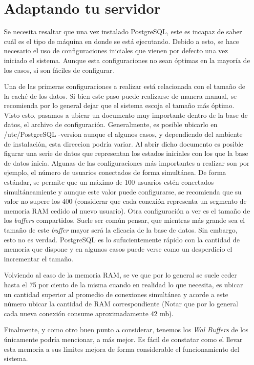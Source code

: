 \documentclass[12pt,conference]{IEEEtran}
\begin{document}
\section{Adaptando tu servidor}

Se necesita resaltar  que una vez instalado PostgreSQL, este es incapaz de saber cuál es el tipo de máquina en donde se está ejecutando. Debido a esto, se hace necesario el uso de configuraciones iniciales que vienen por defecto una vez iniciado el sistema. Aunque esta configuraciones no sean óptimas en la mayoría de los casos, si son fáciles de configurar.

Una de las primeras configuraciones a realizar está relacionada con el tamaño de la caché de los datos. Si bien este paso puede realizarse de manera manual, se recomienda por lo general dejar que el sistema escoja el tamaño más óptimo. Visto esto, pasamos a ubicar un documento muy importante dentro de la base de datos, el archivo de configuración. Generalmente, es posible ubicarlo en /utc/PostgreSQL -version aunque el algunos casos, y dependiendo del ambiente de instalación, esta direccion podría variar. Al abrir dicho documento es posible figurar una serie de datos que representan los estados iniciales con los que la base de datos inicia. Algunas de las configuraciones más importantes a realizar son por ejemplo, el número de usuarios conectados de forma simultánea. De forma estándar, se permite que un máximo de 100 usuarios estén conectados simultáneamiente y aunque este valor puede configurarse, se recomienda que su valor no supere los 400 (considerar que cada conexión representa un segmento de memoria RAM cedido al nuevo usuario). Otra configuración a ver es el tamaño de los  \textit{buffers} compartidos. Suele ser común pensar, que mientras más grande sea el tamaño de este \textit{buffer} mayor será la eficacia de la base de datos. Sin embargo, esto no es verdad. PostgreSQL es lo sufucientemente rápido con la cantidad de memoria que dispone y en algunos casos puede verse como un desperdicio el incrementar el tamaño.

Volviendo al caso de la memoria RAM, se ve que por lo general se suele ceder hasta el 75 por ciento de la misma cuando en realidad lo que necesita, es ubicar un cantidad superior al promedio de conexiones simultánea y acorde a este número ubicar la cantidad de RAM correspondiente (Notar que por lo general cada nueva conexión consume aproximadamente 42 mb). 

Finalmente, y como otro buen punto a considerar, tenemos los \textit{Wal Buffers} de los únicamente podría mencionar, a más mejor. Es fácil de constatar como el llevar esta memoria a sus límites mejora de forma considerable el funcionamiento del sistema.
\end{document}
